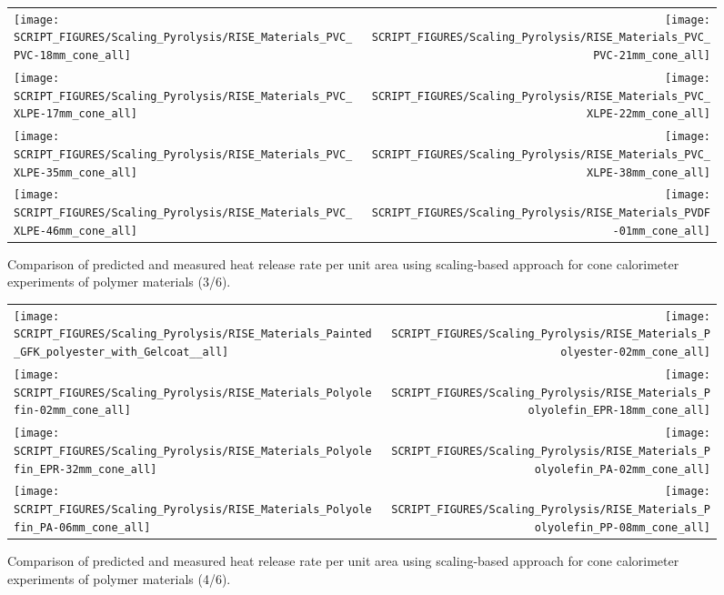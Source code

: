 \begin{figure}[!h]
\begin{tabular*}{\textwidth}{l@{\extracolsep{\fill}}r}
\texttt{[image: SCRIPT\_FIGURES/Scaling\_Pyrolysis/RISE\_Materials\_PVC\_PVC-18mm\_cone\_all]} &
\texttt{[image: SCRIPT\_FIGURES/Scaling\_Pyrolysis/RISE\_Materials\_PVC\_PVC-21mm\_cone\_all]} \\
\texttt{[image: SCRIPT\_FIGURES/Scaling\_Pyrolysis/RISE\_Materials\_PVC\_XLPE-17mm\_cone\_all]} &
\texttt{[image: SCRIPT\_FIGURES/Scaling\_Pyrolysis/RISE\_Materials\_PVC\_XLPE-22mm\_cone\_all]} \\
\texttt{[image: SCRIPT\_FIGURES/Scaling\_Pyrolysis/RISE\_Materials\_PVC\_XLPE-35mm\_cone\_all]} &
\texttt{[image: SCRIPT\_FIGURES/Scaling\_Pyrolysis/RISE\_Materials\_PVC\_XLPE-38mm\_cone\_all]} \\
\texttt{[image: SCRIPT\_FIGURES/Scaling\_Pyrolysis/RISE\_Materials\_PVC\_XLPE-46mm\_cone\_all]} &
\texttt{[image: SCRIPT\_FIGURES/Scaling\_Pyrolysis/RISE\_Materials\_PVDF-01mm\_cone\_all]} \\
\end{tabular*}
\caption[Heat release rate per unit area of RISE materials using scaling model, polymer materials]
{Comparison of predicted and measured heat release rate per unit area using scaling-based approach for cone calorimeter experiments of polymer materials (3/6).}
\label{RISE_Materials_polymers3}
\end{figure}

\begin{figure}[!h]
\begin{tabular*}{\textwidth}{l@{\extracolsep{\fill}}r}
\texttt{[image: SCRIPT\_FIGURES/Scaling\_Pyrolysis/RISE\_Materials\_Painted\_GFK\_polyester\_with\_Gelcoat\_\_all]} &
\texttt{[image: SCRIPT\_FIGURES/Scaling\_Pyrolysis/RISE\_Materials\_Polyester-02mm\_cone\_all]} \\
\texttt{[image: SCRIPT\_FIGURES/Scaling\_Pyrolysis/RISE\_Materials\_Polyolefin-02mm\_cone\_all]} &
\texttt{[image: SCRIPT\_FIGURES/Scaling\_Pyrolysis/RISE\_Materials\_Polyolefin\_EPR-18mm\_cone\_all]} \\
\texttt{[image: SCRIPT\_FIGURES/Scaling\_Pyrolysis/RISE\_Materials\_Polyolefin\_EPR-32mm\_cone\_all]} &
\texttt{[image: SCRIPT\_FIGURES/Scaling\_Pyrolysis/RISE\_Materials\_Polyolefin\_PA-02mm\_cone\_all]} \\
\texttt{[image: SCRIPT\_FIGURES/Scaling\_Pyrolysis/RISE\_Materials\_Polyolefin\_PA-06mm\_cone\_all]} &
\texttt{[image: SCRIPT\_FIGURES/Scaling\_Pyrolysis/RISE\_Materials\_Polyolefin\_PP-08mm\_cone\_all]} \\
\end{tabular*}
\caption[Heat release rate per unit area of RISE materials using scaling model, polymer materials]
{Comparison of predicted and measured heat release rate per unit area using scaling-based approach for cone calorimeter experiments of polymer materials (4/6).}
\label{RISE_Materials_polymers4}
\end{figure}

